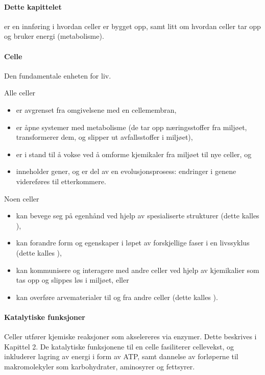 
\paragraph{Dette kapittelet} er en innføring i hvordan celler er bygget opp, samt litt om hvordan celler tar opp og bruker energi (metabolisme).

\paragraph{Celle} Den fundamentale enheten for liv. 

\noindent Alle celler
\begin{itemize}[nolistsep,noitemsep]
	\item er avgrenset fra omgivelsene med en cellemembran,
	\item er åpne systemer med metabolisme (de tar opp næringsstoffer fra miljøet, transformerer dem, og slipper ut avfallsstoffer i miljøet),
	\item er i stand til å vokse ved å omforme kjemikaler fra miljøet til nye celler, og
	\item inneholder gener, og er del av en evolusjonsprosess: endringer i genene videreføres til etterkommere.
\end{itemize}

\noindent Noen celler
\begin{itemize}[nolistsep,noitemsep]
	\item kan bevege seg på egenhånd ved hjelp av spesialiserte strukturer (dette kalles ),
	\item kan forandre form og egenskaper i løpet av forskjellige faser i en livssyklus (dette kalles ),
	\item kan kommunisere og interagere med andre celler ved hjelp av kjemikalier som tas opp og slippes løs i miljøet, eller
	\item kan overføre arvematerialer til og fra andre celler (dette kalles ).
\end{itemize}

\paragraph{Katalytiske funksjoner} Celler utfører kjemiske reaksjoner som akselereres via enzymer. Dette beskrives i Kapittel 2. De katalytiske funksjonene til en celle fasiliterer cellevekst, og inkluderer lagring av energi i form av ATP, samt dannelse av forløperne til makromolekyler som karbohydrater, aminosyrer og fettsyrer.

